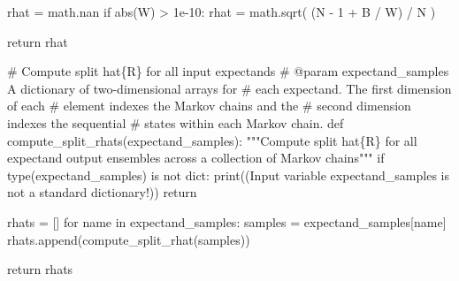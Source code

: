 \documentclass[
  letterpaper,
  DIV=11,
  numbers=noendperiod]{scrartcl}
\newenvironment{Shaded}{\begin{snugshade}}{\end{snugshade}}
\newcommand{\BuiltInTok}[1]{\textcolor[rgb]{0.00,0.23,0.31}{#1}}
\newcommand{\CommentTok}[1]{\textcolor[rgb]{0.37,0.37,0.37}{#1}}
\newcommand{\ControlFlowTok}[1]{\textcolor[rgb]{0.00,0.23,0.31}{#1}}
\newcommand{\DecValTok}[1]{\textcolor[rgb]{0.68,0.00,0.00}{#1}}
\newcommand{\FloatTok}[1]{\textcolor[rgb]{0.68,0.00,0.00}{#1}}
\newcommand{\KeywordTok}[1]{\textcolor[rgb]{0.00,0.23,0.31}{#1}}
\newcommand{\NormalTok}[1]{\textcolor[rgb]{0.00,0.23,0.31}{#1}}
\newcommand{\OperatorTok}[1]{\textcolor[rgb]{0.37,0.37,0.37}{#1}}
\newcommand{\StringTok}[1]{\textcolor[rgb]{0.13,0.47,0.30}{#1}}
\begin{document}
\begin{Shaded}
\begin{Highlighting}[]
\NormalTok{  rhat }\OperatorTok{=}\NormalTok{ math.nan}
  \ControlFlowTok{if} \BuiltInTok{abs}\NormalTok{(W) }\OperatorTok{\textgreater{}} \FloatTok{1e{-}10}\NormalTok{:}
\NormalTok{    rhat }\OperatorTok{=}\NormalTok{ math.sqrt( (N }\OperatorTok{{-}} \DecValTok{1} \OperatorTok{+}\NormalTok{ B }\OperatorTok{/}\NormalTok{ W) }\OperatorTok{/}\NormalTok{ N )}
  
  \ControlFlowTok{return}\NormalTok{ rhat}
\end{Highlighting}
\end{Shaded}

\begin{Shaded}
\begin{Highlighting}[]
\CommentTok{\# Compute split hat\{R\} for all input expectands}
\CommentTok{\# @param expectand\_samples A dictionary of two{-}dimensional arrays for }
\CommentTok{\#                          each expectand.  The first dimension of each}
\CommentTok{\#                          element indexes the Markov chains and the }
\CommentTok{\#                          second dimension indexes the sequential }
\CommentTok{\#                          states within each Markov chain.}
\KeywordTok{def}\NormalTok{ compute\_split\_rhats(expectand\_samples):}
  \CommentTok{"""Compute split hat\{R\} for all expectand output ensembles across}
\CommentTok{     a collection of Markov chains"""}
  \ControlFlowTok{if} \BuiltInTok{type}\NormalTok{(expectand\_samples) }\KeywordTok{is} \KeywordTok{not} \BuiltInTok{dict}\NormalTok{:}
    \BuiltInTok{print}\NormalTok{((}\StringTok{\textquotesingle{}Input variable \textasciigrave{}expectand\_samples\textasciigrave{} \textquotesingle{}}
           \StringTok{\textquotesingle{}is not a standard dictionary!\textquotesingle{}}\NormalTok{))}
    \ControlFlowTok{return}
    
\NormalTok{  rhats }\OperatorTok{=}\NormalTok{ []}
  \ControlFlowTok{for}\NormalTok{ name }\KeywordTok{in}\NormalTok{ expectand\_samples:}
\NormalTok{    samples }\OperatorTok{=}\NormalTok{ expectand\_samples[name]}
\NormalTok{    rhats.append(compute\_split\_rhat(samples))}
  
  \ControlFlowTok{return}\NormalTok{ rhats}
\end{Highlighting}
\end{Shaded}
\end{document}
